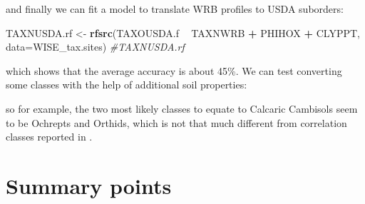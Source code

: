 \documentclass[graybox,natbib,nospthms,UStrade]{svmono}
\newenvironment{Shaded}{\begin{snugshade}}{\end{snugshade}}
\newcommand{\CommentTok}[1]{\textcolor[rgb]{0.37,0.37,0.37}{\textit{#1}}}
\newcommand{\DataTypeTok}[1]{\textcolor[rgb]{0.27,0.27,0.27}{#1}}
\newcommand{\DecValTok}[1]{\textcolor[rgb]{0.06,0.06,0.06}{#1}}
\newcommand{\FloatTok}[1]{\textcolor[rgb]{0.06,0.06,0.06}{#1}}
\newcommand{\KeywordTok}[1]{\textcolor[rgb]{0.27,0.27,0.27}{\textbf{#1}}}
\newcommand{\NormalTok}[1]{#1}
\newcommand{\OperatorTok}[1]{\textcolor[rgb]{0.43,0.43,0.43}{\textbf{#1}}}
\newcommand{\StringTok}[1]{\textcolor[rgb]{0.5,0.5,0.5}{#1}}
\begin{document}
and finally we can fit a model to translate WRB profiles to USDA suborders:

\begin{Shaded}
\begin{Highlighting}[]
\NormalTok{TAXNUSDA.rf <-}\StringTok{ }\KeywordTok{rfsrc}\NormalTok{(TAXOUSDA.f }\OperatorTok{~}\StringTok{ }\NormalTok{TAXNWRB }\OperatorTok{+}\StringTok{ }\NormalTok{PHIHOX }\OperatorTok{+}\StringTok{ }\NormalTok{CLYPPT, }\DataTypeTok{data=}\NormalTok{WISE_tax.sites)}
\CommentTok{#TAXNUSDA.rf}
\end{Highlighting}
\end{Shaded}

which shows that the average accuracy is about 45\%. We can test converting some classes with the help of additional soil properties:

\begin{Shaded}
\end{Shaded}

so for example, the two most likely classes to equate to Calcaric Cambisols seem to be Ochrepts and Orthids, which is not that much different from correlation classes reported in \citet{Krasilnikov2009handbook}.

\hypertarget{summary-points}{%
\section{Summary points}\label{summary-points}}
\end{document}
